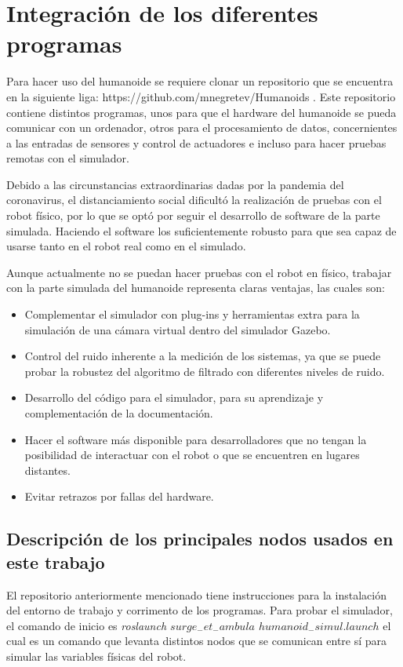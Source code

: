 	\section{Integración de los diferentes programas}
	Para hacer uso del humanoide se requiere clonar un repositorio que se encuentra en la siguiente liga: https://github.com/mnegretev/Humanoids . Este repositorio contiene distintos programas, unos para que el hardware del humanoide se pueda comunicar con un ordenador, otros para el procesamiento de datos, concernientes a las entradas de sensores y control de actuadores e incluso para hacer pruebas remotas con el simulador.
	
	Debido a las circunstancias extraordinarias dadas por la pandemia del coronavirus, el distanciamiento social dificultó la realización de pruebas con el robot físico, por lo que se optó por seguir el desarrollo de software de la parte simulada. Haciendo el software los suficientemente robusto para que sea capaz de usarse tanto en el robot real como en el simulado.
	
	Aunque actualmente no se puedan hacer pruebas con el robot en físico, trabajar con la parte simulada del humanoide representa claras ventajas, las cuales son: 
	 
	\begin{itemize}
	 	\item Complementar el simulador con plug-ins y herramientas extra para la simulación de una cámara virtual dentro del simulador Gazebo.
	 	\item Control del ruido inherente a la medición de los sistemas, ya que se puede probar la robustez del algoritmo de filtrado con diferentes niveles de ruido.
	 	\item Desarrollo del código para el simulador, para su aprendizaje y complementación de la documentación.
	 	\item Hacer el software más disponible para desarrolladores que no tengan la posibilidad de interactuar con el robot o que se encuentren en lugares distantes.
	 	\item Evitar retrazos por fallas del hardware.
	\end{itemize}
	
		\subsection*{Descripción de los principales nodos usados en este trabajo}
		El repositorio anteriormente mencionado tiene instrucciones para la instalación del entorno de trabajo y corrimento de los programas. Para probar el simulador, el comando de inicio es  \textit{roslaunch $surge_-et_-ambula$ $humanoid_-simul.launch$} el cual es un comando que levanta distintos nodos que se comunican entre sí para simular las variables físicas del robot. 
		
